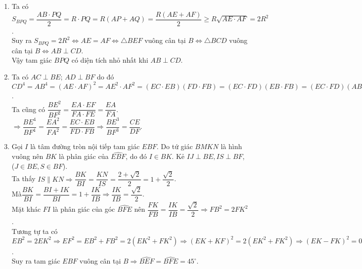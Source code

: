 \begin{ex}
{\begin{enumerate}
Mặt khác $\widehat{ABQ}=\widehat{APH}\Rightarrow \widehat{AEO}=\widehat{APH}$ nên $PH\parallel EO \hfill (2)$\\
Trong tam giác $AEO$ có $P$ là trung điểm của $AE$, kết hợp với $(1),(2)$ suy ra $H$ là trung điểm của $OA.$
\item Ta có $S_{BPQ}=\dfrac{AB\cdot PQ}{2}=R\cdot PQ =R(AP+AQ)=\dfrac{R(AE+AF)}{2}\ge R\sqrt{AE\cdot AF}=2R^2$.\\
Suy ra $S_{BPQ}=2R^2\Leftrightarrow AE=AF\Leftrightarrow \triangle BEF$ vuông cân tại $B \Leftrightarrow \triangle BCD$ vuông cân tại $B\Leftrightarrow AB \perp CD$.\\
Vậy tam giác $BPQ$ có diện tích nhỏ nhất khi $AB\perp CD$.
\item Ta có $AC\perp BE$; $AD\perp BF$ do đó $CD^4=AB^4=(AE\cdot AF)^2 =AE^2\cdot AF^2 =(EC\cdot EB)(FD\cdot FB)= (EC\cdot FD)(EB\cdot FB)=(EC\cdot FD)(AB\cdot EF)=CE\cdot DF \cdot CD\cdot EF\Rightarrow CD^3=CE\cdot DF\cdot EF$.\\
Ta cũng có $\dfrac{BE^2}{BF^2}=\dfrac{EA\cdot EF}{FA\cdot FE}=\dfrac{EA}{FA}$.\\
$\Rightarrow \dfrac{BE^4}{BF^4}=\dfrac{EA^2}{FA^2}=\dfrac{EC\cdot EB}{FD\cdot FB}\Rightarrow \dfrac{BE^3}{BF^3}=\dfrac{CE}{DF}$.
\item Gọi $I$ là tâm đường tròn nội tiếp tam giác $EBF$. Do tứ giác $BMKN$ là hình vuông nên $BK$ là phân giác của $\widehat{EBF}$, do đó $I\in BK$. Kẻ $IJ\perp BE, IS\perp BF$, ($J\in BE,S\in BF$).\\
Ta thấy $IS\parallel KN \Rightarrow \dfrac{BK}{BI}=\dfrac{KN}{IS}=\dfrac{2+\sqrt{2}}{2}=1+\dfrac{\sqrt{2}}{2}$.\\
Mà$\dfrac{BK}{BI}=\dfrac{BI+IK}{BI}=1+\dfrac{IK}{IB}\Rightarrow \dfrac{IK}{IB}=\dfrac{\sqrt{2}}{2}$.\\
Mặt khác $FI$ là phân giác của góc $\widehat{BFE}$ nên $\dfrac{FK}{FB}=\dfrac{IK}{IB}=\dfrac{\sqrt{2}}{2}\Rightarrow FB^2=2FK^2$.\\
Tương tự ta có $EB^2=2EK^2\Rightarrow EF^2=EB^2+FB^2=2(EK^2+FK^2)\Rightarrow (EK+KF)^2=2(EK^2+FK^2)\Rightarrow (EK-FK)^2=0\Rightarrow EK=FK$.\\
Suy ra tam giác $EBF$ vuông cân tại $B\Rightarrow \widehat{BEF}=\widehat{BFE}=45^\circ$. 
\end{enumerate}}
\end{ex} 


